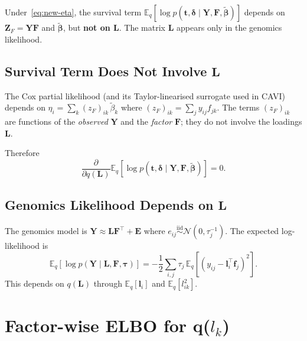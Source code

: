 \documentclass[11pt]{article}
\newcommand{\E}{\mathbb{E}}
\newcommand{\N}{\mathcal{N}}
\begin{document}
\begin{derivbox}
Under~\eqref{eq:new-eta}, the survival term
$\E_q[\log p(\mathbf{t}, \boldsymbol{\delta} \mid \mathbf{Y}, \mathbf{F}, \tilde{\boldsymbol{\beta}})]$
depends on $\mathbf{Z}_F = \mathbf{Y}\mathbf{F}$ and $\tilde{\boldsymbol{\beta}}$, but
\textbf{not on $\mathbf{L}$}. The matrix $\mathbf{L}$ appears only in the genomics likelihood.
\end{derivbox}

\subsection{Survival Term Does Not Involve $\mathbf{L}$}

The Cox partial likelihood (and its Taylor-linearised surrogate used in CAVI) depends on
$\eta_i = \sum_k (z_F)_{ik}\,\tilde{\beta}_k$ where $(z_F)_{ik} = \sum_j y_{ij} f_{jk}$.
The terms $(z_F)_{ik}$ are functions of the \emph{observed} $\mathbf{Y}$ and the \emph{factor} $\mathbf{F}$;
they do not involve the loadings $\mathbf{L}$.

Therefore
\begin{equation}
  \frac{\partial}{\partial q(\mathbf{L})} \E_q[\log p(\mathbf{t}, \boldsymbol{\delta} \mid \mathbf{Y}, \mathbf{F}, \tilde{\boldsymbol{\beta}})] = 0.
\end{equation}

\subsection{Genomics Likelihood Depends on $\mathbf{L}$}

The genomics model is $\mathbf{Y} \approx \mathbf{L}\mathbf{F}^\top + \mathbf{E}$ where
$e_{ij} \overset{\text{iid}}{\sim} \N(0, \tau_j^{-1})$. The expected log-likelihood is
\begin{equation}
  \E_q[\log p(\mathbf{Y} \mid \mathbf{L}, \mathbf{F}, \boldsymbol{\tau})]
  = -\frac{1}{2}\sum_{i,j} \tau_j \,\E_q[(y_{ij} - \mathbf{l}_i^\top \mathbf{f}_j)^2].
  \label{eq:genomics-lik}
\end{equation}
This depends on $q(\mathbf{L})$ through $\E_q[\mathbf{l}_i]$ and $\E_q[l_{ik}^2]$.

\section{Factor-wise ELBO for q($l_k$)}
\end{document}
